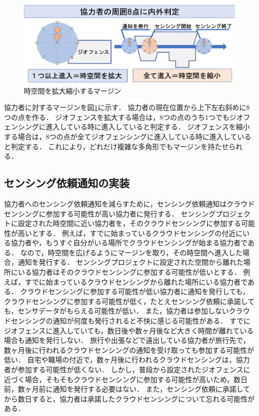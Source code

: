\begin{figure}[tbh]
    \centering
    \includegraphics[width=16cm]{img_margin_2.png}
    \caption{時空間を拡大縮小するマージン}
    \label{fig:margin_2}
\end{figure}

協力者に対するマージンを図\ref{fig:margin_2}に示す．
協力者の現在位置から上下左右斜めに8つの点を作る．
ジオフェンスを拡大する場合は，8つの点のうち1つでもジオフェンシングに進入している時に進入していると判定する．
ジオフェンスを縮小する場合は，8つの点が全てジオフェンシングに進入している時に進入していると判定する．
これにより，どれだけ複雑な多角形でもマージンを持たせられる．






\subsection{センシング依頼通知の実装}
\label{myApp_notify}
協力者へのセンシング依頼通知を減らすために，センシング依頼通知はクラウドセンシングに参加する可能性が高い協力者に発行する．
センシングプロジェクトに設定された時空間に近い協力者を，そのクラウドセンシングに参加する可能性が高いとする．
例えば，すでに始まっているクラウドセンシングの付近にいる協力者や，もうすぐ自分がいる場所でクラウドセンシングが始まる協力者である．
なので，時空間を広げるようにマージンを取り，その時空間へ進入した場合，通知を発行する．
センシングプロジェクトに設定された空間から離れた場所にいる協力者はそのクラウドセンシングに参加する可能性が低いとする．
例えば，すでに始まっているクラウドセンシングから離れた場所にいる協力者である．
クラウドセンシングに参加する可能性が低い協力者に通知を発行しても，クラウドセンシングに参加する可能性が低く，たとえセンシング依頼に承諾しても，センサデータがもらえる可能性が低い．
また，協力者は参加しないクラウドセンシングの通知が何度も発行されると不快に感じる可能性がある．
すでにジオフェンスに進入していても，数日後や数ヶ月後など大きく時間が離れている場合も通知を発行しない．
旅行や出張などで遠出している協力者が旅行先で，数ヶ月後に行われるクラウドセンシングの通知を受け取っても参加する可能性が低い．
自宅や職場の付近で，数ヶ月後に行われるクラウドセンシングは，協力者が参加する可能性が低くない．
しかし，普段から設定されたジオフェンスに近づく場合，そもそもクラウドセンシングに参加する可能性が高いため，数日前，数ヶ月前に通知を発行する必要はない．
また，センシング依頼に承諾してから数日すると，協力者は承諾したクラウドセンシングについて忘れる可能性がある．


